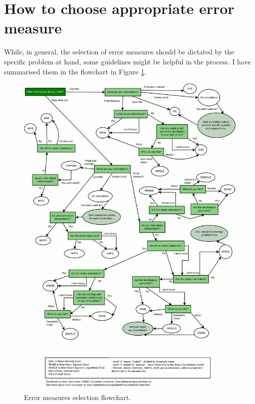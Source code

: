 \documentclass[
]{book}
\theoremstyle{definition}
\theoremstyle{definition}
\theoremstyle{definition}
\theoremstyle{definition}
\theoremstyle{remark}
\begin{document}
\hypertarget{errorMeasuresSelection}{%
\section{How to choose appropriate error measure}\label{errorMeasuresSelection}}

While, in general, the selection of error measures should be dictated by the specific problem at hand, some guidelines might be helpful in the process. I have summarised them in the flowchart in Figure \ref{fig:errorMeasuresFlowChart}.

\begin{figure}
\includegraphics[width=1\linewidth]{./images/errorMeasuresFlowChart} \caption{Error measures selection flowchart.}\label{fig:errorMeasuresFlowChart}
\end{figure}
\end{document}

